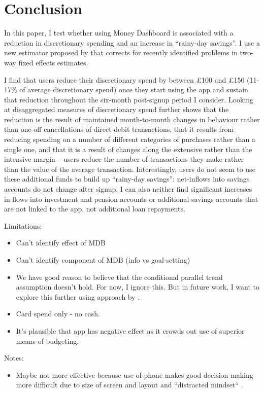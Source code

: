 
\section{Conclusion}
\label{sec:conclusion}

In this paper, I test whether using Money Dashboard is associated
with a reduction in discretionary spending and an increase in ``rainy-day
savings''. I use a new estimator proposed by \citet{callaway2021difference}
that corrects for recently identified problems in two-way fixed effects
estimates.

I find that users reduce their discretionary spend by between \pounds100 and
\pounds150 (11-17\% of average discretionary spend) once they start using the
app and sustain that reduction throughout the six-month post-signup period I
consider. Looking at disaggregated measures of discretionary spend further
shows that the reduction is the result of maintained month-to-month changes in
behaviour rather than one-off cancellations of direct-debit transactions, that
it results from reducing spending on a number of different categories of
purchases rather than a single one, and that it is a result of changes along
the extensive rather than the intensive margin -- users reduce the number of
transactions they make rather than the value of the average transaction.
Interestingly, users do not seem to use these additional funds to build up
``rainy-day savings'': net-inflows into savings accounts do not change after
signup. I can also neither find significant increases in flows into investment
and pension accounts or additional savings accounts that are not linked to the
app, not additional loan repayments.

Limitations:
\begin{itemize}

    \item Can't identify effect of MDB

    \item Can't identify component of MDB (info vs goal-setting)

    \item We have good reason to believe that the conditional parallel trend
        assumption doesn't hold. For now, I ignore this. But in future work, I
        want to explore this further using approach by
        \citet{rambachan2022more}.

    \item Card spend only - no cash.

    \item It's plausible that app has negative effect as it crowds out
use of superior means of budgeting. 


\end{itemize}


Notes:
\begin{itemize}
    \item Maybe not more effective because use of phone makes good decision
        making more difficult due to size of screen and layout and ``distracted
        mindset`` \citet{levi2020mind}.
\end{itemize}
